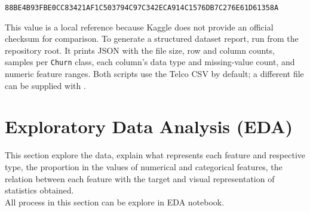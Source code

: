 \documentclass{article}
\begin{document}
\begin{center}
\small\texttt{88BE4B93FBE0CC83421AF1C503794C97C342ECA914C1576DB7C276E61D61358A}
\end{center}

This value is a local reference because Kaggle does not provide an official checksum for comparison. To generate a structured dataset report, run  from the repository root. It prints JSON with the file size, row and column counts, samples per \texttt{Churn} class, each column's data type and missing-value count, and numeric feature ranges. Both scripts use the Telco CSV by default; a different file can be supplied with .


\section{Exploratory Data Analysis (EDA)}

This section explore the data, explain what represents each feature and respective type, 
the proportion in the values of numerical and categorical features, 
the relation between each feature with the target and visual representation of statistics obtained.
\\All process in this section can be explore in EDA notebook. 
\end{document}
